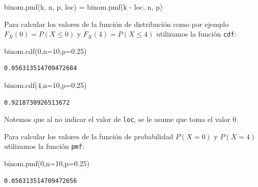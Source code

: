 \documentclass[
  letterpaper,
  DIV=11,
  numbers=noendperiod]{scrreprt}
\newenvironment{Shaded}{\begin{snugshade}}{\end{snugshade}}
\newcommand{\DecValTok}[1]{\textcolor[rgb]{0.68,0.00,0.00}{#1}}
\newcommand{\FloatTok}[1]{\textcolor[rgb]{0.68,0.00,0.00}{#1}}
\newcommand{\NormalTok}[1]{\textcolor[rgb]{0.00,0.23,0.31}{#1}}
\newcommand{\OperatorTok}[1]{\textcolor[rgb]{0.37,0.37,0.37}{#1}}
\begin{document}
\begin{Shaded}
\begin{Highlighting}[]
\NormalTok{binom.pmf(k, n, p, loc) }\OperatorTok{=}\NormalTok{  binom.pmf(k }\OperatorTok{{-}}\NormalTok{ loc, n, p)}
\end{Highlighting}
\end{Shaded}

Para calcular los valores de la función de distribución como por ejemplo
\(F_X(0)=P(X\leq 0)\) y \(F_X(4)=P(X\leq 4)\) utilizamos la función
\texttt{cdf}:

\begin{Shaded}
\begin{Highlighting}[]
\NormalTok{binom.cdf(}\DecValTok{0}\NormalTok{,n}\OperatorTok{=}\DecValTok{10}\NormalTok{,p}\OperatorTok{=}\FloatTok{0.25}\NormalTok{)}
\end{Highlighting}
\end{Shaded}

\begin{verbatim}
0.056313514709472684
\end{verbatim}

\begin{Shaded}
\begin{Highlighting}[]
\NormalTok{binom.cdf(}\DecValTok{4}\NormalTok{,n}\OperatorTok{=}\DecValTok{10}\NormalTok{,p}\OperatorTok{=}\FloatTok{0.25}\NormalTok{)}
\end{Highlighting}
\end{Shaded}

\begin{verbatim}
0.9218730926513672
\end{verbatim}

Notemos que al no indicar el valor de \texttt{loc}, se le asume que toma
el valor 0.

Para calcular los valores de la función de probabilidad \(P(X=0)\) y
\(P(X=4)\) utilizamos la función \texttt{pmf}:

\begin{Shaded}
\begin{Highlighting}[]
\NormalTok{binom.pmf(}\DecValTok{0}\NormalTok{,n}\OperatorTok{=}\DecValTok{10}\NormalTok{,p}\OperatorTok{=}\FloatTok{0.25}\NormalTok{)}
\end{Highlighting}
\end{Shaded}

\begin{verbatim}
0.056313514709472656
\end{verbatim}
\end{document}
